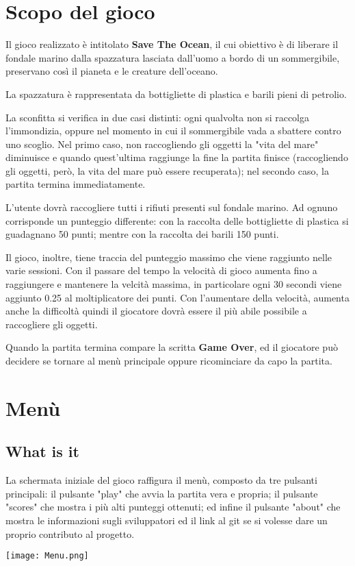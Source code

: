 \documentclass[12pt]{article}
\begin{document}
\section{Scopo del gioco}
Il gioco realizzato è intitolato \textbf{Save The Ocean}, il cui obiettivo è di liberare il fondale marino dalla spazzatura lasciata dall'uomo a bordo di un sommergibile, preservano così il pianeta e le creature dell'oceano.

La spazzatura è rappresentata da bottigliette di plastica e barili pieni di petrolio.


La sconfitta si verifica in due casi distinti: ogni qualvolta non si raccolga l'immondizia, oppure nel momento in cui il sommergibile vada a sbattere contro uno scoglio. Nel primo caso, non raccogliendo gli oggetti la "vita del mare" diminuisce e quando quest'ultima raggiunge la fine la partita finisce (raccogliendo gli oggetti, però, la vita del mare può essere recuperata); nel secondo caso, la partita termina immediatamente. 

L'utente dovrà raccogliere tutti i rifiuti presenti sul fondale marino. Ad ognuno corrisponde un punteggio differente: con la raccolta delle bottigliette di plastica si guadagnano 50 punti; mentre con la raccolta dei barili 150 punti.

Il gioco, inoltre, tiene traccia del punteggio massimo che viene raggiunto nelle varie sessioni.
Con il passare del tempo la velocità di gioco aumenta fino a raggiungere e mantenere la velcità massima, in particolare ogni 30 secondi viene aggiunto 0.25 al moltiplicatore dei punti. Con l'aumentare della velocità, aumenta anche la difficoltà quindi il giocatore dovrà essere il più abile possibile a raccogliere gli oggetti. 

Quando la partita termina compare la scritta \textbf{Game Over}, ed il giocatore può decidere se tornare al menù principale oppure ricominciare da capo la partita.
\section{Menù}
\subsection{What is it}
La schermata iniziale del gioco raffigura il menù, composto da tre pulsanti principali: il pulsante "play" che avvia la partita vera e propria; il pulsante "scores" che mostra i più alti punteggi ottenuti; ed infine il pulsante "about" che mostra le informazioni sugli sviluppatori ed il link al git se si volesse dare un proprio contributo al progetto. \\
\begin{center}
    \texttt{[image: Menu.png]}\\
\end{center}
\end{document}
